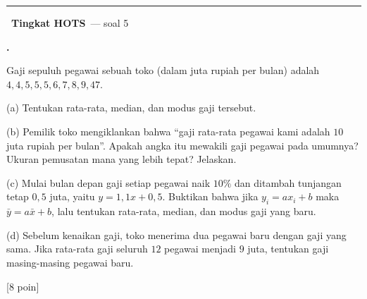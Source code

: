 \documentclass[a4paper,11pt]{article}
\newcounter{no}
\newcommand{\tingkat}[2]{\par\Needspace{7\baselineskip}\vspace{0.6em}\noindent
  {\color{teal}\rule{3pt}{1.1em}}\ {\color{navy}\bfseries #1}\ {\small\color{gray}--- #2}\par\vspace{0.1em}}
\newcommand{\soal}[2]{\par\vspace{0.75em}\stepcounter{no}\noindent
  \begin{minipage}[t]{1.8em}\textbf{\theno.}\end{minipage}%
  \begin{minipage}[t]{\dimexpr\linewidth-1.8em\relax}#1\par\vspace{0.35em}#2\end{minipage}\par}
\newcommand{\poin}[1]{\hfill{\small\color{navy}[#1 poin]}}
\begin{document}
\tingkat{Tingkat HOTS}{soal 5}
\soal{Gaji sepuluh pegawai sebuah toko (dalam juta rupiah per bulan) adalah $4,4,5,5,5,6,7,8,9,47$.\par\smallskip
(a) Tentukan rata-rata, median, dan modus gaji tersebut.\par
(b) Pemilik toko mengiklankan bahwa ``gaji rata-rata pegawai kami adalah $10$ juta rupiah per bulan''. Apakah angka itu mewakili gaji pegawai pada umumnya? Ukuran pemusatan mana yang lebih tepat? Jelaskan.\par
(c) Mulai bulan depan gaji setiap pegawai naik $10\%$ dan ditambah tunjangan tetap $0{,}5$ juta, yaitu $y=1{,}1x+0{,}5$. Buktikan bahwa jika $y_i=ax_i+b$ maka $\bar{y}=a\bar{x}+b$, lalu tentukan rata-rata, median, dan modus gaji yang baru.\par
(d) Sebelum kenaikan gaji, toko menerima dua pegawai baru dengan gaji yang sama. Jika rata-rata gaji seluruh $12$ pegawai menjadi $9$ juta, tentukan gaji masing-masing pegawai baru.}{\poin{8}}
\end{document}
